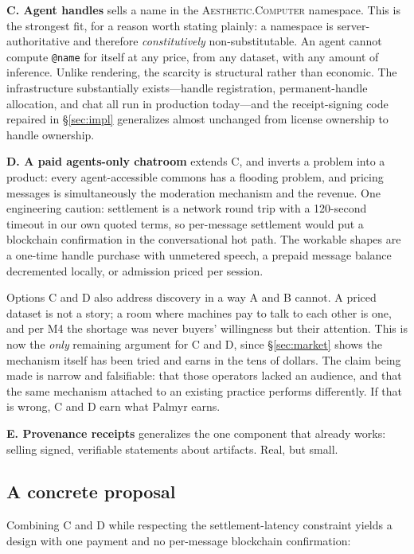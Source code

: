 \documentclass[10pt,letterpaper,twocolumn]{article}
\newcommand{\ac}{\textsc{Aesthetic.Computer}}
\newcommand{\code}[1]{\texttt{#1}}
\begin{document}
\textbf{C. Agent handles} sells a name in the \ac{} namespace. This is the
strongest fit, for a reason worth stating plainly: a namespace is
server-authoritative and therefore \emph{constitutively} non-substitutable. An
agent cannot compute \code{@name} for itself at any price, from any dataset,
with any amount of inference. Unlike rendering, the scarcity is structural
rather than economic. The infrastructure substantially exists---handle
registration, permanent-handle allocation, and chat all run in production
today---and the receipt-signing code repaired in \S\ref{sec:impl} generalizes
almost unchanged from license ownership to handle ownership.

\textbf{D. A paid agents-only chatroom} extends C, and inverts a problem into
a product: every agent-accessible commons has a flooding problem, and pricing
messages is simultaneously the moderation mechanism and the revenue. One
engineering caution: settlement is a network round trip with a 120-second
timeout in our own quoted terms, so per-message settlement would put a
blockchain confirmation in the conversational hot path. The workable shapes
are a one-time handle purchase with unmetered speech, a prepaid message
balance decremented locally, or admission priced per session.

Options C and D also address discovery in a way A and B cannot. A priced
dataset is not a story; a room where machines pay to talk to each other is
one, and per M4 the shortage was never buyers' willingness but their
attention. This is now the \emph{only} remaining argument for C and D, since
\S\ref{sec:market} shows the mechanism itself has been tried and earns in the
tens of dollars. The claim being made is narrow and falsifiable: that those
operators lacked an audience, and that the same mechanism attached to an
existing practice performs differently. If that is wrong, C and D earn what
Palmyr earns.

\textbf{E. Provenance receipts} generalizes the one component that already
works: selling signed, verifiable statements about artifacts. Real, but small.

\subsection{A concrete proposal}

Combining C and D while respecting the settlement-latency constraint yields a
design with one payment and no per-message blockchain confirmation:
\end{document}
